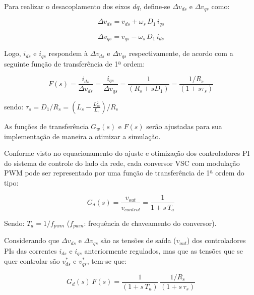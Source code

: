Para realizar o desacoplamento dos eixos $dq$, define-se $\Delta v_{ds}$ e $\Delta v_{qs}$ como:

\begin{equation}
\label{eq:delta_vds}
  \Delta v_{ds} = v_{ds} + \omega_s\,D_1\,i_{qs}
\end{equation}

\begin{equation}
\label{eq:delta_vqs}
  \Delta v_{qs} = v_{qs} - \omega_s\,D_1\,i_{ds}
\end{equation}


Logo, $ i_{ds} $ e $ i_{qs} $ respondem à $ \Delta v_{ds} $ e $ \Delta v_{qs} $ respectivamente, de acordo com a seguinte função de transferência de 1ª ordem:

\begin{equation}
\label{eq:fctr_F}
  F(s) = \frac{i_{ds}}{\Delta v_{ds}} = \frac{i_{qs}}{\Delta v_{qs}} = \frac{1}{(R_s + sD_1)}  = \frac{1/R_s}{(1 + s\tau_s)}
\end{equation}

sendo: $ \tau_s = D_1/R_s = \left (L_s - \frac{L_m^2}{L_r} \right)/R_s  $


As funções de transferência $G_w(s)$ e $F(s)$ serão ajustadas para sua implementação de maneira a otimizar a simulação.



Conforme visto no equacionamento do ajuste e otimização dos controladores PI do sistema de controle do lado da rede, cada conversor \ac{VSC} com modulação \ac{PWM} pode ser representado por uma função de transferência de 1ª ordem do tipo:

\begin{equation}
  G_{d}(s) = \frac{v_{out}}{v_{control}} = \frac{1}{1 + s\,T_a}
\end{equation}

Sendo: $T_a = 1/f_{pwm}$ ($f_{pwm}$: frequência de chaveamento do conversor).

Considerando que $\Delta v_{ds} $ e $ \Delta v_{qs} $ são as tensões de saída ($ v_{out} $) dos controladores PIs das correntes $i_{ds}$ e $i_{qs}$ anteriormente regulados, mas que as tensões que se quer controlar são $  v_{ds}^* $ e $ v_{qs}^* $, tem-se que:

\begin{equation}
\label{eq:fctr_idq_s}
  G_{d}(s)\,F(s) = \frac{1}{(1 + s\,T_a)}\,\frac{1/R_s}{(1 + s\,\tau_s)}
\end{equation}

